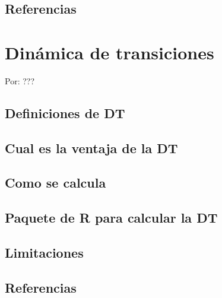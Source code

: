 \documentclass[
]{book}
\theoremstyle{definition}
\theoremstyle{definition}
\theoremstyle{definition}
\theoremstyle{definition}
\theoremstyle{remark}
\begin{document}
\hypertarget{referencias-6}{%
\section{Referencias}\label{referencias-6}}

\hypertarget{dinuxe1mica-de-transiciones}{%
\chapter{Dinámica de transiciones}\label{dinuxe1mica-de-transiciones}}

Por: ???

\hypertarget{definiciones-de-dt}{%
\section{Definiciones de DT}\label{definiciones-de-dt}}

\hypertarget{cual-es-la-ventaja-de-la-dt}{%
\section{Cual es la ventaja de la DT}\label{cual-es-la-ventaja-de-la-dt}}

\hypertarget{como-se-calcula}{%
\section{Como se calcula}\label{como-se-calcula}}

\hypertarget{paquete-de-r-para-calcular-la-dt}{%
\section{Paquete de R para calcular la DT}\label{paquete-de-r-para-calcular-la-dt}}

\hypertarget{limitaciones-1}{%
\section{Limitaciones}\label{limitaciones-1}}

\hypertarget{referencias-7}{%
\section{Referencias}\label{referencias-7}}

\hypertarget{section}{%
\section{}\label{section}}
\end{document}
